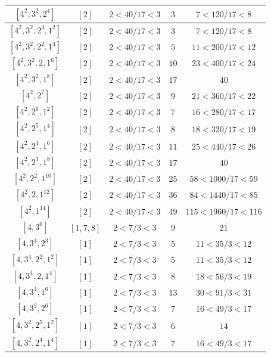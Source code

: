 \documentclass{article}%
\begin{document}
\begin{center}
\begin{longtable}{||c|c|c|c|c||}
$[4^{2}, 3^{2}, 2^{4}]$ & $[2]$ & $2 < 40/17 < 3$ & $3$ & $7 < 120/17 < 8$ \\ \hline 
$[4^{2}, 3^{2}, 2^{3}, 1^{2}]$ & $[2]$ & $2 < 40/17 < 3$ & $3$ & $7 < 120/17 < 8$ \\ \hline 
$[4^{2}, 3^{2}, 2^{2}, 1^{4}]$ & $[2]$ & $2 < 40/17 < 3$ & $5$ & $11 < 200/17 < 12$ \\ \hline 
$[4^{2}, 3^{2}, 2, 1^{6}]$ & $[2]$ & $2 < 40/17 < 3$ & $10$ & $23 < 400/17 < 24$ \\ \hline 
$[4^{2}, 3^{2}, 1^{8}]$ & $[2]$ & $2 < 40/17 < 3$ & $17$ & $40$ \\ \hline 
$[4^{2}, 2^{7}]$ & $[2]$ & $2 < 40/17 < 3$ & $9$ & $21 < 360/17 < 22$ \\ \hline 
$[4^{2}, 2^{6}, 1^{2}]$ & $[2]$ & $2 < 40/17 < 3$ & $7$ & $16 < 280/17 < 17$ \\ \hline 
$[4^{2}, 2^{5}, 1^{4}]$ & $[2]$ & $2 < 40/17 < 3$ & $8$ & $18 < 320/17 < 19$ \\ \hline 
$[4^{2}, 2^{4}, 1^{6}]$ & $[2]$ & $2 < 40/17 < 3$ & $11$ & $25 < 440/17 < 26$ \\ \hline 
$[4^{2}, 2^{3}, 1^{8}]$ & $[2]$ & $2 < 40/17 < 3$ & $17$ & $40$ \\ \hline 
$[4^{2}, 2^{2}, 1^{10}]$ & $[2]$ & $2 < 40/17 < 3$ & $25$ & $58 < 1000/17 < 59$ \\ \hline 
$[4^{2}, 2, 1^{12}]$ & $[2]$ & $2 < 40/17 < 3$ & $36$ & $84 < 1440/17 < 85$ \\ \hline 
$[4^{2}, 1^{14}]$ & $[2]$ & $2 < 40/17 < 3$ & $49$ & $115 < 1960/17 < 116$ \\ \hline 
$[4, 3^{6}]$ & $[1, 7, 8]$ & $2 < 7/3 < 3$ & $9$ & $21$ \\ \hline 
$[4, 3^{4}, 2^{3}]$ & $[1]$ & $2 < 7/3 < 3$ & $5$ & $11 < 35/3 < 12$ \\ \hline 
$[4, 3^{4}, 2^{2}, 1^{2}]$ & $[1]$ & $2 < 7/3 < 3$ & $5$ & $11 < 35/3 < 12$ \\ \hline 
$[4, 3^{4}, 2, 1^{4}]$ & $[1]$ & $2 < 7/3 < 3$ & $8$ & $18 < 56/3 < 19$ \\ \hline 
$[4, 3^{4}, 1^{6}]$ & $[1]$ & $2 < 7/3 < 3$ & $13$ & $30 < 91/3 < 31$ \\ \hline 
$[4, 3^{2}, 2^{6}]$ & $[1]$ & $2 < 7/3 < 3$ & $7$ & $16 < 49/3 < 17$ \\ \hline 
$[4, 3^{2}, 2^{5}, 1^{2}]$ & $[1]$ & $2 < 7/3 < 3$ & $6$ & $14$ \\ \hline 
$[4, 3^{2}, 2^{4}, 1^{4}]$ & $[1]$ & $2 < 7/3 < 3$ & $7$ & $16 < 49/3 < 17$ \\ \hline 

\end{longtable}
\end{center}
\end{document}
